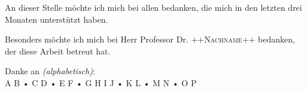 \thispagestyle{empty} %

\newcommand{\dankespace}{\vspace{1.2em}}
\quad\hfill%
\begin{minipage}{.7\textwidth}
An dieser Stelle möchte ich mich bei allen bedanken, die mich in den letzten drei Monaten unterstützt haben.

\dankespace
Besonders möchte ich mich bei Herr Professor Dr. \textsc{++Nachname++} bedanken, der diese Arbeit betreut hat.
\sblindtext

\dankespace
\sblindtext

\dankespace
\blindtext

\vspace{7em}

\begin{footnotesize}\color{darkgray-light}
\begin{center}
Danke an \emph{(alphabetisch)}:\\
A \textsc{B} • C \textsc{D} • E \textsc{F} • G \textsc{H}
I \textsc{J} • K \textsc{L} • M \textsc{N} • O \textsc{P}
\end{center}
\end{footnotesize}
\end{minipage}%
\hfill\quad